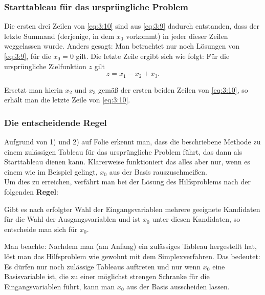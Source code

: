 \documentclass[smaller]{beamer}
\begin{document}
\begin{frame}
 \frametitle{Starttableau für das ursprüngliche Problem}
 Die ersten drei Zeilen von \eqref{eq:3:10} sind aus \eqref{eq:3:9} dadurch entstanden, dass der letzte Summand (derjenige, in dem $x_0$ vorkommt) in jeder dieser Zeilen weggelassen wurde. Anders gesagt: Man betrachtet nur noch Lösungen von \eqref{eq:3:9}, für die $x_0=0$ gilt. Die letzte Zeile ergibt sich wie folgt: Für die ursprüngliche Zielfunktion $z$ gilt
\[
z = x_1 - x_2+x_3.
\]

Ersetzt man hierin $x_2$ und $x_3$ gemäß der ersten beiden Zeilen von \eqref{eq:3:10}, so erhält man die letzte Zeile von \eqref{eq:3:10}.
\end{frame}

\begin{frame}
 \frametitle{Die entscheidende Regel}
 Aufgrund von 1) und 2) auf Folie \pageref{page:3:1} erkennt man, dass die beschriebene Methode zu einem zulässigen Tableau für das ursprüngliche Problem führt, das dann als Starttableau dienen kann. \alert{Klarerweise funktioniert das alles aber nur, wenn es einem wie im Beispiel gelingt, $x_0$ aus der Basis \glqq rauszuschmeißen\grqq}.\\

Um dies zu erreichen, verfährt man bei der Lösung des Hilfsproblems nach der folgenden \textbf{Regel}:\\ \vspace*{0.2cm}

Gibt es nach erfolgter Wahl der Eingangsvariablen mehrere geeignete Kandidaten für die Wahl der Ausgangsvariablen und ist $x_0$ unter diesen Kandidaten, so entscheide man sich für $x_0$.\\ \vspace*{0.2cm}

Man beachte: Nachdem man (am Anfang) ein zulässiges Tableau hergestellt hat, löst man das Hilfsproblem wie gewohnt mit dem Simplexverfahren. Das bedeutet: \alert{Es dürfen nur noch zulässige Tableaus auftreten und nur wenn $x_0$ eine Basisvariable ist, die zu einer möglichst strengen Schranke für die Eingangsvariablen führt, kann man $x_0$ aus der Basis ausscheiden lassen.}
\end{frame}
\end{document}
